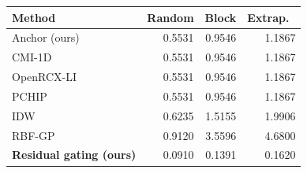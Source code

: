 \small
\begin{tabular}{lrrr}\toprule
Method & Random & Block & Extrap.\ \\\midrule
Anchor (ours) & 0.5531 & 0.9546 & 1.1867 \\
CMI-1D & 0.5531 & 0.9546 & 1.1867 \\
OpenRCX-LI & 0.5531 & 0.9546 & 1.1867 \\
PCHIP & 0.5531 & 0.9546 & 1.1867 \\
IDW & 0.6235 & 1.5155 & 1.9906 \\
RBF-GP & 0.9120 & 3.5596 & 4.6800 \\
\textbf{Residual gating (ours)} & 0.0910 & 0.1391 & 0.1620 \\
\bottomrule\end{tabular}
